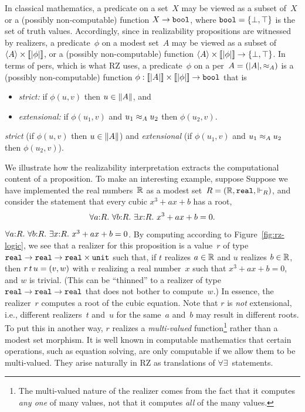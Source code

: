In classical mathematics, a predicate on a set~$X$ may be viewed as a
subset of~$X$ or a (possibly non-computable) function $X \to \mathtt{bool}$,
where $\mathtt{bool} = \{\bot, \top\}$ is the set of truth values.
Accordingly, since in realizability propositions are witnessed by
realizers,
%
\iflong
a predicate~$\phi$ on a modest set~$A$ may be viewed as a
subset of $\langle A \rangle \times [\![|\phi|]\!]$, or a (possibly
non-computable) function $\langle A \rangle \times [\![|\phi|]\!] \to
\{\bot, \top\}$. In terms of pers, which is what RZ uses,
\fi
%
a predicate~$\phi$ on a per~$A = (|A|, {\approx_A})$ is a
(possibly non-computable) function $\phi : [\![|A|]\!] \times
[\![|\phi|]\!] \to \mathtt{bool}$ that is
%
\iflong
\begin{itemize}
\item \emph{strict:} if $\phi(u,v)$ then $u \in \|A\|$, and
\item \emph{extensional:} if $\phi(u_1,v)$ and $u_1 \approx_A u_2$ then
  $\phi(u_2,v)$.
\end{itemize}
\else %
\emph{strict} (if $\phi(u,v)$ then $u \in \|A\|$) 
and \emph{extensional} (if $\phi(u_1,v)$ and $u_1 \approx_A u_2$ then
  $\phi(u_2,v)$).
\fi

\iflong
We illustrate how the realizability interpretation extracts the
computational content of a proposition. To make an interesting
example, suppose
\else %
Suppose
\fi %
we have implemented the real
numbers~$\mathbb{R}$ as a modest set~$R = (\mathbb{R}, \mathtt{real}, {\Vdash_R})$, and
consider  
\iflong
the statement
that every cubic $x^3 + a x + b$ has a root,
%
\begin{equation}
  \label{eq:square-root}%
  \iforall{a}{R}{\iforall{b}{R}{\iexists{x}{R}{\iequal{x^3 + a x + b}{0}}}}.
\end{equation}
\else %
$\forall a{:}R.\ \forall b{:}R.\ \exists x{:}R.\ x^3 + a x + b = 0$.
\fi %
%
By computing according to Figure~\ref{fig:rz-logic}, we see that
a realizer for this proposition is a value~$r$ of type
$\mathtt{real} \to \mathtt{real} \to \mathtt{real} \times \mathtt{unit}$
such that, if $t$ realizes $a \in \mathbb{R}$ and $u$ realizes $b \in
\mathbb{R}$, then $r\,t\,u = (v, w)$ with $v$ realizing a real
number~$x$ such that $x^3 + a x + b = 0$, and $w$ is trivial. (This
can be ``thinned'' to a realizer of type
$\mathtt{real} \to \mathtt{real} \to \mathtt{real}$ that
does not bother to compute~$w$.) In essence, the realizer~$r$
computes a root of the cubic equation. Note
that $r$ is \emph{not} extensional, i.e., different realizers~$t$
and~$u$ for the same~$a$ and~$b$ may result in different roots. 
To put this in another way, $r$ realizes a \emph{multi-valued}
function\footnote{The multi-valued nature of the realizer comes from
  the fact that it computes \emph{any one} of many values, not that it
  computes \emph{all} of the many values.} rather than a modest set
morphism. It is well known in computable mathematics that certain
operations, such as equation solving, are only computable if we allow
them to be multi-valued. They arise naturally in RZ as translations of
$\forall\exists$~statements.

